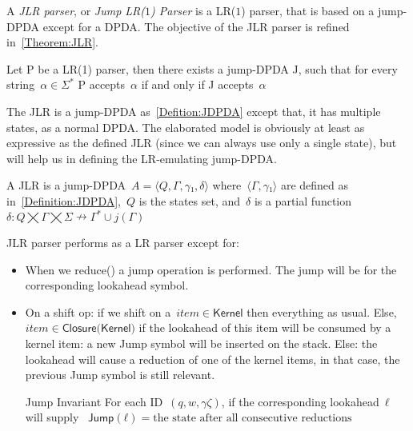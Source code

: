 A \emph{JLR parser}, or \emph{Jump LR($1$) Parser} is a LR($1$) parser, that 
  is based on a jump-DPDA except for a DPDA\@.
The objective of the JLR parser is refined in~\cref{Theorem:JLR}.
  
\begin{Theorem}
  \label{Theorem:JLR}
  Let P be a LR(1) parser, then there exists a jump-DPDA J,
  such that for every string~$α∈Σ^*$
  P accepts~$α$ if and only if J accepts~$α$
\end{Theorem}

The JLR is a jump-DPDA as~\cref{Defition:JDPDA} except that,
  it has multiple states, as a normal DPDA\@.
The elaborated model is obviously at least as expressive as the defined 
  JLR (since we can always use only a single state), but will help us in defining
  the LR-emulating jump-DPDA.
  
A JLR is a jump-DPDA~$A=⟨Q,Γ,γ₁,δ⟩$ where~$⟨Γ,γ₁⟩$ are defined 
  as in~\cref{Definition:JDPDA},~$Q$ is the states set, and~$\delta$ 
  is a partial function~$δ:Q⨉Γ⨉Σ↛Γ^*∪j(Γ)$

JLR parser performs as a LR parser except for:
\begin{itemize}
  \item When we \textsf{reduce()} a jump operation is performed.
    The jump will be for the corresponding lookahead symbol.

  \item On a shift op:
  if we shift on a~$item∈\textsf{Kernel}$
    then everything as usual.
  Else,~$item∈\textsf{Closure(Kernel)}$
      if the lookahead of this item will be consumed by a kernel item:
        a new Jump symbol will be inserted on the stack.
      Else:
        the lookahead will cause a reduction of one of the kernel items,
        in that case, the previous Jump symbol is still relevant.
  \item[Jump Invariant] For each ID~$(q,w,γζ)$, if the corresponding lookahead~$ℓ$ will supply
~$\textsf{Jump}(ℓ)= \text{the state after all consecutive reductions}$
\end{itemize}
